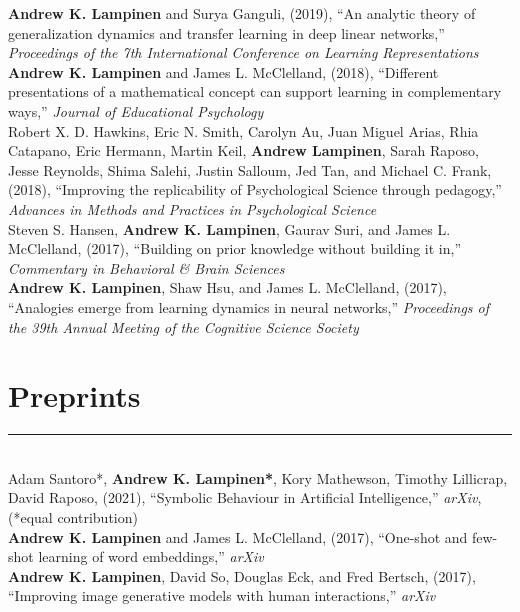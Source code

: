 \documentclass[margin]{res}
\begin{document}
\begin{resume}
\textbf{Andrew K. Lampinen} and Surya Ganguli, (2019), {``An analytic theory of generalization dynamics and transfer learning in deep linear networks,''} \textit{Proceedings of the 7th International Conference on Learning Representations} \\[3pt] 
\textbf{Andrew K. Lampinen} and James L. McClelland, (2018), {``Different presentations of a mathematical concept can support learning in complementary ways,''} \textit{Journal of Educational Psychology} \\[3pt]
 Robert X. D. Hawkins, Eric N. Smith, Carolyn Au, Juan Miguel Arias, Rhia Catapano, Eric Hermann, Martin Keil, \textbf{Andrew Lampinen}, Sarah Raposo, Jesse Reynolds, Shima Salehi, Justin Salloum, Jed Tan, and Michael C. Frank, (2018), {``Improving the replicability of Psychological Science through pedagogy,''}  \textit{Advances in Methods and Practices in Psychological Science} \\ [3pt]
Steven S. Hansen, \textbf{Andrew K. Lampinen}, Gaurav Suri, and James L. McClelland, (2017), {``Building on prior knowledge without building it in,''} \textit{Commentary in Behavioral \& Brain Sciences}  \\[3pt]
\textbf{Andrew K. Lampinen}, Shaw Hsu, and James L. McClelland, (2017), {``Analogies emerge from learning dynamics in neural networks,''} \textit{Proceedings of the 39th Annual Meeting of the Cognitive Science Society}  

\vspace{1pt}\section{Preprints} \vspace{-15pt} \rule{\textwidth}{0.5pt} \\[3pt]
Adam Santoro*, \textbf{Andrew K. Lampinen*}, Kory Mathewson, Timothy Lillicrap, David Raposo, (2021), {``Symbolic Behaviour in Artificial Intelligence,''} \textit{arXiv}, (*equal contribution) \\[3pt] 
\textbf{Andrew K. Lampinen} and James L. McClelland, (2017), {``One-shot and few-shot learning of word embeddings,''} \textit{arXiv} \\[3pt] 
\textbf{Andrew K. Lampinen}, David So, Douglas Eck, and Fred Bertsch, (2017), {``Improving image generative models with human interactions,''} \textit{arXiv} 


\end{resume}
\end{document}

